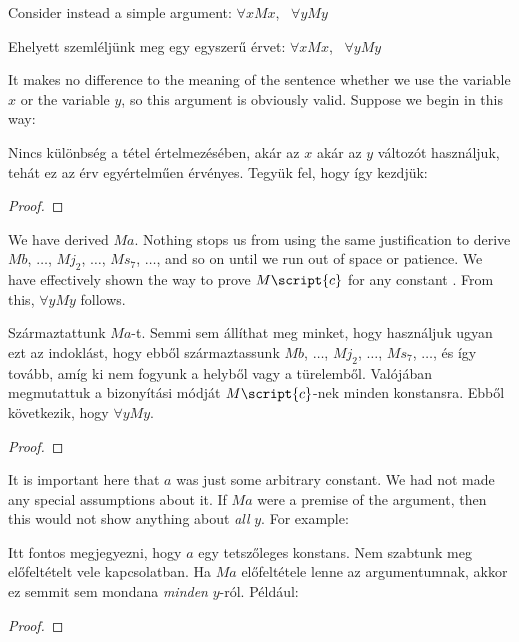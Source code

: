 Consider instead a simple argument: $\forall x Mx$, \therefore\ $\forall y My$

Ehelyett szemléljünk meg egy egyszerű érvet: $\forall x Mx$, \therefore\ $\forall y My$

It makes no difference to the meaning of the sentence whether we use the variable $x$ or the variable $y$, so this argument is obviously valid. Suppose we begin in this way:

Nincs különbség a tétel értelmezésében, akár az $x$ akár az $y$ változót használjuk, tehát ez az érv egyértelműen érvényes.
Tegyük fel, hogy így kezdjük:

\begin{proof}
	 
	 
\end{proof}

We have derived $Ma$. Nothing stops us from using the same justification to derive $Mb$, $\ldots$, $Mj_2$, $\ldots$, $Ms_7$, $\ldots$, and so on until we run out of space or patience. We have effectively shown the way to prove $M\script{c}$ for any constant . From this, $\forall y My$ follows.

Származtattunk $Ma$-t. Semmi sem állíthat meg minket, hogy használjuk ugyan ezt az indoklást, hogy ebből származtassunk  $Mb$, $\ldots$, $Mj_2$, $\ldots$, $Ms_7$, $\ldots$, és így tovább, amíg ki nem fogyunk a helyből vagy a türelemből. Valójában megmutattuk a bizonyítási módját $M\script{c}$-nek minden  konstansra. Ebből következik, hogy $\forall y My$.



\begin{proof}
	 
	 
\end{proof}

It is important here that $a$ was just some arbitrary constant. We had not made any special assumptions about it. If $Ma$ were a premise of the argument, then this would not show anything about \emph{all} $y$. For example:

Itt fontos megjegyezni, hogy $a$ egy tetszőleges konstans. Nem szabtunk meg előfeltételt vele kapcsolatban. Ha $Ma$ előfeltétele lenne az argumentumnak, akkor ez semmit sem mondana \emph{minden} $y$-ról. Például:

\begin{proof}
	 
	 
\end{proof}

